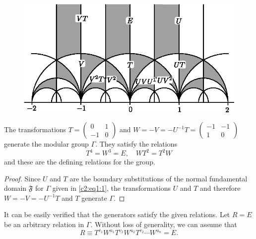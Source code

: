 \setcounter{figure}{11}
\begin{figure}[H]
\centering
\includegraphics{vol29-fig/fig29-12.eps}
\smallskip
\caption{}
\label{chap2:fig12}
\end{figure}

\begin{thm}\label{chap2:thm8}
The \pageoriginale transformations $T = \left(\begin{smallmatrix}
0 &1\\-1& 0
\end{smallmatrix}\right)$ and $W=-V=-U^{-1}T=\left(\begin{smallmatrix}
-1 &-1\\1& 0
\end{smallmatrix}\right)$ generate the modular group $\Gamma$. They
satisfy the relations 
$$
T^4 = W^3 = E, \quad WT^2 = T^2W 
$$
and these are the defining relations for the group.
\end{thm}

\begin{proof}
Since $U$ and $T$ are the boundary substitutions of the normal
fundamental domain $\mathfrak{F}$ for $\Gamma$ given in \eqref{c2:eq1:1}, the
transformations $U$ and $T$ and therefore $W=-V=-U^{-1}T$ and $T$
generate $\Gamma$.
\end{proof}

It can be easily verified that the generators satisfy the given
relations. Let $R=E$ be an arbitrary relation in $\Gamma$. Without
loss of generality, we can assume that 
$$
R \equiv T^{v_1} W^{u_1} T^{v_2} W^{u_2} T^{v_2} \cdots W^{u_n}=E.
$$


